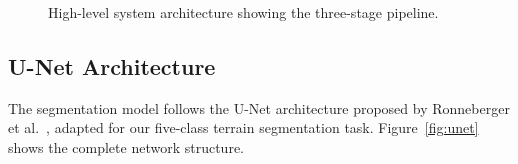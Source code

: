 \documentclass[12pt,a4paper]{article}
\begin{document}
\begin{figure}[H]
\centering
{}
\caption{High-level system architecture showing the three-stage pipeline.}
\label{fig:architecture}
\end{figure}

\subsection{U-Net Architecture}

The segmentation model follows the U-Net architecture proposed by Ronneberger et al.~\cite{ronneberger2015}, adapted for our five-class terrain segmentation task. Figure~\ref{fig:unet} shows the complete network structure.
\end{document}
